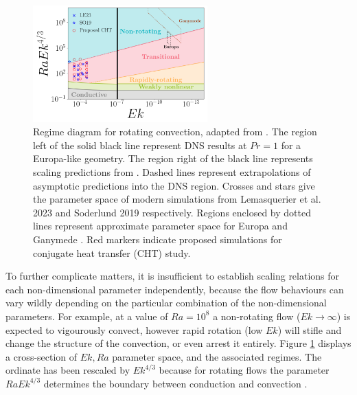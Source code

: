 \documentclass{article}
\begin{document}
\begin{figure}
	\begin{center}
		\includegraphics[width=0.6\textwidth]{figures/reg_diagram}
	\end{center}
	\caption{Regime diagram for rotating convection, adapted from \citep{dL23,tG16}. The region left of the solid black line represent DNS results at $Pr = 1$ for a Europa-like geometry\citep{aB22}. The region right of the black line represents scaling predictions from \citep{tG16}. Dashed lines represent extrapolations of asymptotic predictions into the DNS region. Crosses and stars give the parameter space of modern simulations from Lemasquerier et al. 2023\citep{dL23} and Soderlund 2019\citep{kS19} respectively. Regions enclosed by dotted lines represent approximate parameter space for Europa and Ganymede \citep{dL23,kS19}. Red markers indicate proposed simulations for conjugate heat transfer (CHT) study.}
	\label{f:reg_d}
\end{figure}

To further complicate matters, it is insufficient to establish scaling relations for each non-dimensional parameter independently, because the flow behaviours can vary wildly depending on the particular combination of the non-dimensional parameters. 
For example, at a value of $Ra = 10^{8}$ a non-rotating flow ($Ek\rightarrow \infty$) is expected to vigourously convect, however rapid rotation (low  $Ek$) will stifle and change the structure of the convection, or even arrest it entirely. 
Figure \ref{f:reg_d} displays a cross-section of $Ek,Ra$ parameter space, and the associated regimes. The ordinate has been rescaled by $Ek^{4/3}$ because for rotating flows the parameter $RaEk^{4/3}$ determines the boundary between conduction and convection \citep{sC61}.
\end{document}
